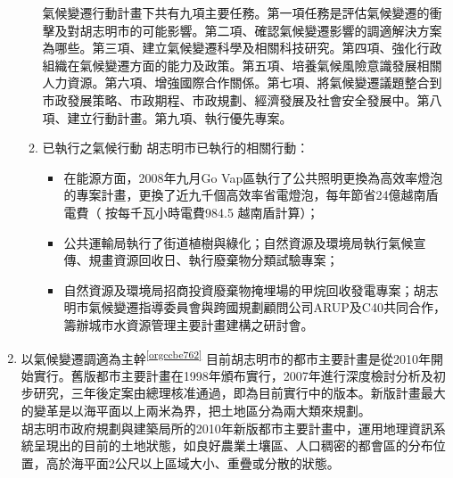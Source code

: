 \documentclass[a4paper,12pt]{article}
\begin{document}
\begin{enumerate}
\begin{enumerate}
氣候變遷行動計畫下共有九項主要任務。第一項任務是評估氣候變遷的衝擊及對胡志明市的可能影響。第二項、確認氣候變遷影響的調適解決方案為哪些。第三項、建立氣候變遷科學及相關科技研究。第四項、強化行政組織在氣候變遷方面的能力及政策。第五項、培養氣候風險意識發展相關人力資源。第六項、增強國際合作關係。第七項、將氣候變遷議題整合到市政發展策略、市政期程、市政規劃、經濟發展及社會安全發展中。第八項、建立行動計畫。第九項、執行優先專案。\\
\item 已執行之氣候行動
\label{sec:orga3ecd69}
胡志明市已執行的相關行動：\\
\begin{itemize}
\item 在能源方面，2008年九月Go Vap區執行了公共照明更換為高效率燈泡的專案計畫，更換了近九千個高效率省電燈泡，每年節省24億越南盾電費（ 按每千瓦小時電費984.5 越南盾計算）；\\
\item 公共運輸局執行了街道植樹與綠化；自然資源及環境局執行氣候宣傳、規畫資源回收日、執行廢棄物分類試驗專案；\\
\item 自然資源及環境局招商投資廢棄物掩埋場的甲烷回收發電專案；胡志明市氣候變遷指導委員會與跨國規劃顧問公司ARUP及C40共同合作，籌辦城市水資源管理主要計畫建構之研討會。\\
\end{itemize}
\end{enumerate}
\item 以氣候變遷調適為主幹\textsuperscript{\ref{orgccbe762}}
\label{sec:orgb3b6115}
目前胡志明市的都市主要計畫是從2010年開始實行。舊版都市主要計畫在1998年頒布實行，2007年進行深度檢討分析及初步研究，三年後定案由總理核准通過，即為目前實行中的版本。新版計畫最大的變革是以海平面以上兩米為界，把土地區分為兩大類來規劃。\\

胡志明市政府規劃與建築局所的2010年新版都市主要計畫中，運用地理資訊系統呈現出的目前的土地狀態，如良好農業土壤區、人口稠密的都會區的分布位置，高於海平面2公尺以上區域大小、重疊或分散的狀態。\\
\end{enumerate}
\end{document}
